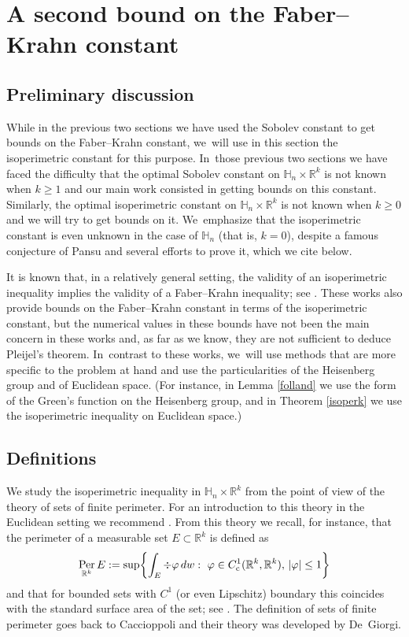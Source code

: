 \documentclass[JEP,XML,SOM,Unicode,published]{cedram}
\newcommand{\rc}{\textup{c}}
\theoremstyle{definition}
\let\phi\varphi
\newcommand{\1}{\mathbbm{1}}
\newcommand{\R}{\mathbb{R}}
\DeclareMathOperator{\per}{Per}
\begin{document}
\section{A second bound on the Faber--Krahn constant}\label{sec:isoperimetric}

\subsection{Preliminary discussion}
While in the previous two sections we have used the Sobolev constant to get bounds on the Faber--Krahn constant, we~will use in this section the isoperimetric constant for this purpose. In~those previous two sections we have faced the difficulty that the optimal Sobolev constant on $\mathbb H_n\times\R^k$ is not known when $k\geq 1$ and our main work consisted in getting bounds on this constant. Similarly, the optimal isoperimetric constant on $\mathbb H_n\times\R^k$ is not known when $k\geq 0$ and we will try to get bounds on it. We~emphasize that the isoperimetric constant is even unknown in the case of $\mathbb H_n$ (that is, $k=0$), despite a famous conjecture of Pansu \cite{Pa2} and several efforts to prove it, which we cite below.

It is known that, in a relatively general setting, the validity of an isoperimetric inequality implies the validity of a Faber--Krahn inequality; see \cite{Car,BaCoLeSC,Va}. These works also provide bounds on the Faber--Krahn constant in terms of the isoperimetric constant, but the numerical values in these bounds have not been the main concern in these works and, as far as we know, they are not sufficient to deduce Pleijel's theorem. In~contrast to these works, we~will use methods that are more specific to the problem at hand and use the particularities of the Heisenberg group and of Euclidean space. (For instance, in Lemma \ref{folland} we use the form of the Green's function on the Heisenberg group, and in Theorem \ref{isoperk} we use the isoperimetric inequality on Euclidean space.)

\subsection{Definitions}
We study the isoperimetric inequality in $\mathbb H_n\times\R^k$ from the point of view of the theory of sets of finite perimeter. For an introduction to this theory in the Euclidean setting we recommend \cite{Ma}. From this theory we recall, for instance, that the perimeter of a measurable set $E\subset\R^k$ is defined as
\[
\per_{\R^k} E := \sup \biggl\{ \int_E \div \phi \,dw :\ \phi\in C^1_\rc(\R^k,\R^k),\,|\phi|\leq 1\biggr\}
\]
and that for bounded sets with $C^1$ (or even Lipschitz) boundary this coincides with the standard surface area of the set; see \cite[Ex.\,12.5 \& 12.6]{Ma}. The definition of sets of finite perimeter goes back to Caccioppoli and their theory was developed by De~Giorgi.
\end{document}
